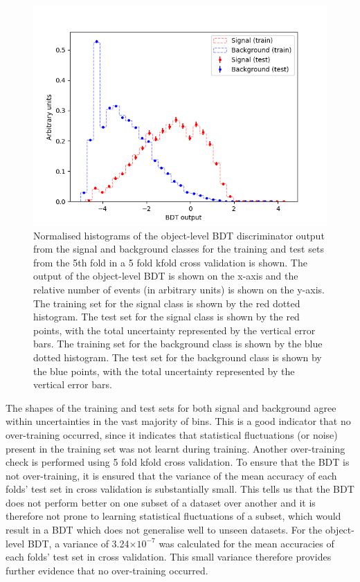 \begin{figure}[h!]
	\includegraphics[scale=0.45]{figures/overtrainingCheck_4lep_lb.png}
	\centering
	\caption{Normalised histograms of the object-level BDT discriminator output from the signal and background classes for the training and test sets from the 5th fold in a 5 fold kfold cross validation is shown. The output of the object-level BDT is shown on the x-axis and the relative number of events (in arbitrary units) is shown on the y-axis. The training set for the signal class is shown by the red dotted histogram. The test set for the signal class is shown by the red points, with the total uncertainty represented by the vertical error bars. The training set for the background class is shown by the blue dotted histogram. The test set for the background class is shown by the blue points, with the total uncertainty represented by the vertical error bars.}
	\label{fig:object-bdt-overtrain-check}
\end{figure}
The shapes of the training and test sets for both signal and background agree within uncertainties in the vast majority of bins. This is a good indicator that no over-training occurred, since it indicates that statistical fluctuations (or noise) present in the training set was not learnt during training. Another over-training check is performed using 5 fold kfold cross validation. To ensure that the BDT is not over-training, it is ensured that the variance of the mean accuracy of each folds' test set in cross validation is substantially small. This tells us that the BDT does not perform better on one subset of a dataset over another and it is therefore not prone to learning statistical fluctuations of a subset, which would result in a BDT which does not generalise well to unseen datasets. For the object-level BDT, a variance of 3.24$\times 10^{-7}$ was calculated for the mean accuracies of each folds' test set in cross validation. This small variance therefore provides further evidence that no over-training occurred.\\

